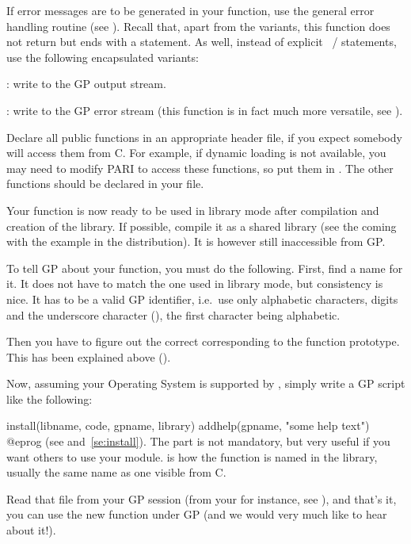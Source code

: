 If error messages are to be generated in your function, use the general
error handling routine  (see ). Recall that, apart
from the  variants, this function does not return but ends with
a  statement. As well, instead of explicit ~/
 statements, use the following encapsulated variants:

: write  to the GP output stream.

: write  to the GP error stream (this
function is in fact much more versatile, see ).

Declare all public functions in an appropriate header file, if you
expect somebody will access them from C.  For example, if dynamic
loading is not available, you may need to modify PARI to access these
functions, so put them in . The other functions should
be declared  in your file.

Your function is now ready to be used in library mode after compilation and
creation of the library. If possible, compile it as a shared library (see
the  coming with the  example in the
distribution). It is however still inaccessible from GP.\smallskip


To tell GP about your function, you must do the following. First, find a
name for it. It does not have to match the one used in library mode, but
consistency is nice. It has to be a valid GP identifier, i.e.~use only
alphabetic characters, digits and the underscore character (\kbd{\_}), the
first character being alphabetic.

Then you have to figure out the correct  corresponding to
the function prototype. This has been explained above
().

Now, assuming your Operating System is supported by , simply
write a GP script like the following:

\bprog
install(libname, code, gpname, library)
addhelp(gpname, "some help text")
@eprog
\noindent(see  and~\ref{se:install}). The 
part is not mandatory, but very useful if you want others to use your
module.   is how the function is named in the library,
usually the same name as one visible from C.

Read that file from your GP session (from your  for
instance, see ), and that's it, you can use the new
function  under GP (and we would very much like to hear about
it!).

